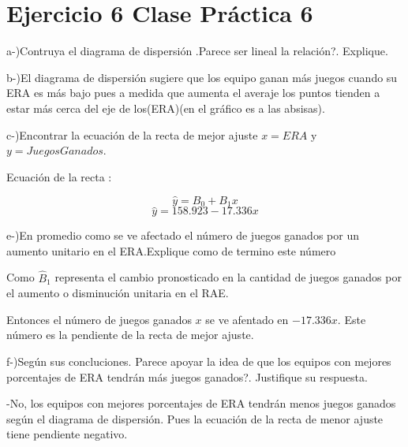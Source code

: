 \documentclass{article}
\begin{document}
	\section*{Ejercicio 6 Clase Pr\'actica 6 }

		\begin{flushleft}
			a-)Contruya el diagrama de dispersi\'on .Parece ser lineal la relaci\'on?. Explique.
		\end{flushleft}

		\begin{flushleft}
			b-)El diagrama de dispersi\'on sugiere que los equipo ganan m\'as juegos cuando su ERA es m\'as bajo pues a medida que aumenta el averaje los puntos tienden a estar m\'as cerca del eje de los(ERA)(en el gr\'afico es a las absisas).
		\end{flushleft}

		\begin{flushleft}
			c-)Encontrar la ecuaci\'on de la recta de mejor ajuste $x = ERA$ y $y = Juegos Ganados$.
		\end{flushleft}

		\begin{flushleft}
			Ecuaci\'on de la recta :
		\end{flushleft}
		$$ \hat y = B_{0} + B_{1}x$$
		$$ \hat y = 158.923 - 17.336 x$$

		\begin{flushleft}
			e-)En promedio como se ve afectado el n\'umero de juegos ganados por un aumento unitario en el ERA.Explique como de termino este n\'umero 
		\end{flushleft}

		\begin{flushleft}
			Como $\hat B_{1}$ representa el cambio pronosticado en la cantidad de juegos ganados por el aumento o disminuci\'on unitaria en el RAE.
		\end{flushleft}

		\begin{flushleft}
			Entonces el n\'umero de juegos ganados $x$ se ve afentado en $-17.336 x$. Este n\'umero es la pendiente de la recta de mejor ajuste.
		\end{flushleft}

		\begin{flushleft}
			f-)Seg\'un sus concluciones. \textquestiondown Parece apoyar la idea de que los equipos con mejores porcentajes de ERA tendr\'an m\'as juegos ganados?. Justifique su respuesta. 
		\end{flushleft}

		\begin{flushleft}
			-No, los equipos con mejores porcentajes de ERA tendr\'an menos juegos ganados seg\'un el diagrama de dispersi\'on. Pues la ecuaci\'on de la recta de menor ajuste tiene pendiente negativo.
		\end{flushleft}
		
\end{document}
